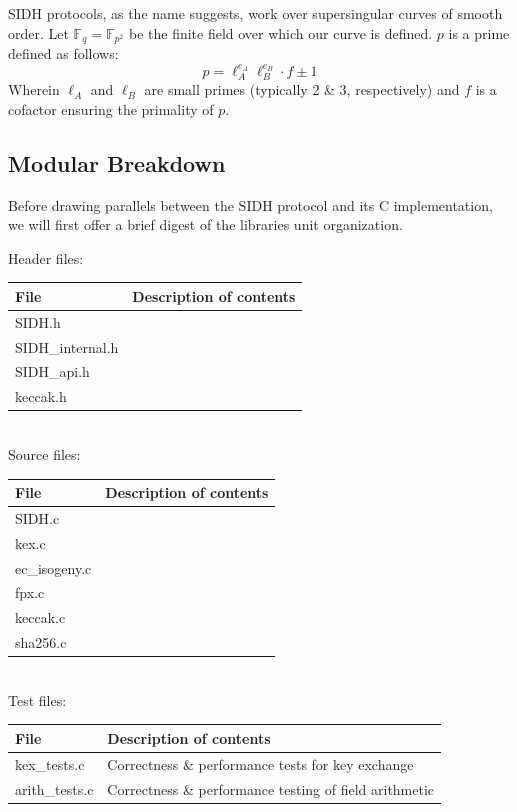 SIDH protocols, as the name suggests, work over supersingular curves of smooth order. Let $\mathbb{F}_q = \mathbb{F}_{p^2}$ be the finite field over which our curve is defined. $p$ is a prime defined as follows:
$$
p = \ell_{A}^{e_A}\ell_{B}^{e_B} \cdot f \pm 1
$$
Wherein $\ell_{A}$ and $\ell_{B}$ are small primes (typically 2 \& 3, respectively) and $f$ is a cofactor ensuring the primality of $p$. 

\subsection{Modular Breakdown}

Before drawing parallels between the SIDH protocol and its C implementation, we will first offer a brief digest of the libraries unit organization.\\

\begin{center}
Header files:\\
	\begin{tabular}{@{}ll@{}}
		File & Description of contents\\
		\toprule
		SIDH.h & \\
		\midrule
		SIDH\_internal.h & \\
		\midrule
		SIDH\_api.h & \\
		\midrule
		keccak.h & \\
		\bottomrule
	\end{tabular}\\
	
Source files:\\
	\begin{tabular}{@{}ll@{}}
		File & Description of contents\\
		\toprule
		SIDH.c & \\
		\midrule
		kex.c & \\
		\midrule
		ec\_isogeny.c & \\
		\midrule
		fpx.c & \\
		\midrule
		keccak.c & \\
		\midrule
		sha256.c & \\
		\bottomrule
	\end{tabular}\\
	
Test files:\\
	\begin{tabular}{@{}ll@{}}
		File & Description of contents\\
		\toprule
		kex\_tests.c & Correctness \& performance tests for key exchange\\
		\midrule
		arith\_tests.c & Correctness \& performance testing of field arithmetic\\
		\bottomrule
	\end{tabular}
\end{center}

